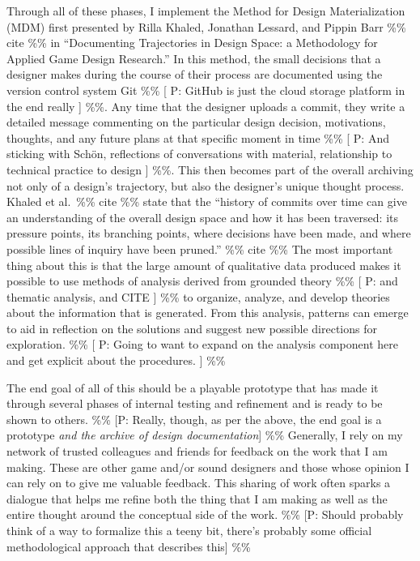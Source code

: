 \documentclass[
]{article}
\begin{document}
Through all of these phases, I implement the Method for Design
Materialization (MDM) first presented by Rilla Khaled, Jonathan Lessard,
and Pippin Barr \%\% cite \%\% in ``Documenting Trajectories in Design
Space: a Methodology for Applied Game Design Research.'' In this method,
the small decisions that a designer makes during the course of their
process are documented using the version control system Git \%\% {[} P:
GitHub is just the cloud storage platform in the end really {]} \%\%.
Any time that the designer uploads a commit, they write a detailed
message commenting on the particular design decision, motivations,
thoughts, and any future plans at that specific moment in time \%\% {[}
P: And sticking with Schön, reflections of conversations with material,
relationship to technical practice to design {]} \%\%. This then becomes
part of the overall archiving not only of a design's trajectory, but
also the designer's unique thought process. Khaled et al.~\%\% cite \%\%
state that the ``history of commits over time can give an understanding
of the overall design space and how it has been traversed: its pressure
points, its branching points, where decisions have been made, and where
possible lines of inquiry have been pruned.'' \%\% cite \%\% The most
important thing about this is that the large amount of qualitative data
produced makes it possible to use methods of analysis derived from
grounded theory \%\% {[} P: and thematic analysis, and CITE {]} \%\% to
organize, analyze, and develop theories about the information that is
generated. From this analysis, patterns can emerge to aid in reflection
on the solutions and suggest new possible directions for exploration.
\%\% {[} P: Going to want to expand on the analysis component here and
get explicit about the procedures. {]} \%\%

The end goal of all of this should be a playable prototype that has made
it through several phases of internal testing and refinement and is
ready to be shown to others. \%\% {[}P: Really, though, as per the
above, the end goal is a prototype \emph{and the archive of design
documentation}{]} \%\% Generally, I rely on my network of trusted
colleagues and friends for feedback on the work that I am making. These
are other game and/or sound designers and those whose opinion I can rely
on to give me valuable feedback. This sharing of work often sparks a
dialogue that helps me refine both the thing that I am making as well as
the entire thought around the conceptual side of the work. \%\% {[}P:
Should probably think of a way to formalize this a teeny bit, there's
probably some official methodological approach that describes this{]}
\%\%
\end{document}
